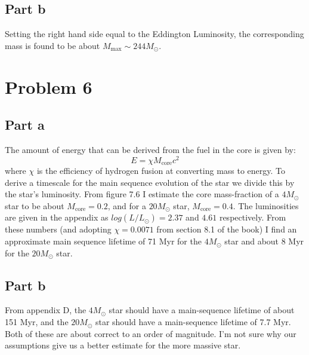 \documentclass[a4paper, 11pt]{article}
\begin{document}
	\subsection*{Part b}
		Setting the right hand side equal to the Eddington Luminosity, the corresponding mass is found to be 
		about $M_\text{max} \sim 244 M_\odot$. 
\section*{Problem 6}
	\subsection*{Part a}
	The amount of energy that can be derived from the fuel in the core is given by:
	\begin{equation*}
		E = \chi M_\text{core}c^2
	\end{equation*}
	where $\chi$ is the efficiency of hydrogen fusion at converting mass to energy. To derive a timescale for 
	the main sequence evolution of the star we divide this by the star's luminosity. From figure 7.6 I estimate the 
	core mass-fraction of a $4 M_\odot$ star to be about $M_\text{core} = 0.2$, and for a $20 M_\odot$ star, 
	$M_\text{core} = 0.4$. The luminosities are given in the appendix as $log(L/L_\odot) = 2.37$ and $4.61$ 
	respectively. From these numbers (and adopting $\chi = 0.0071$ from section 8.1 of the book) I find 
	an approximate main sequence lifetime of 71 Myr for the $4 M_\odot$ star and about 8 Myr for the $20 M_\odot$ 
	star. 
	\subsection*{Part b}
		From appendix D, the $4 M_\odot$ star should have a main-sequence lifetime of about 151 Myr, and the 
		$20 M_\odot$ star should have a main-sequence lifetime of 7.7 Myr. Both of these are about correct to 
		an order of magnitude. I'm not sure why our assumptions give us a better estimate for the more massive star. 
\end{document}
